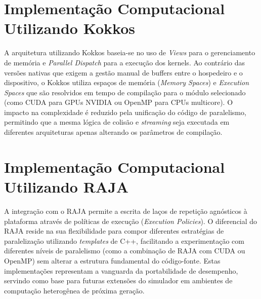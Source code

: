 \section{Implementação Computacional Utilizando Kokkos}\label{sec:implementacao-computacional-utilizando-kokkos}

A arquitetura utilizando Kokkos baseia-se no uso de \textit{Views} para o gerenciamento de memória e \textit{Parallel Dispatch} para a execução dos kernels.
Ao contrário das versões nativas que exigem a gestão manual de buffers entre o hospedeiro e o dispositivo, o Kokkos utiliza espaços de memória (\textit{Memory Spaces}) e \textit{Execution Spaces} que são resolvidos em tempo de compilação para o módulo selecionado (como CUDA para GPUs NVIDIA ou OpenMP para CPUs multicore).
O impacto na complexidade é reduzido pela unificação do código de paralelismo, permitindo que a mesma lógica de colisão e \textit{streaming} seja executada em diferentes arquiteturas apenas alterando os parâmetros de compilação.


\section{Implementação Computacional Utilizando RAJA}\label{sec:implementacao-computacional-utilizando-raja}

A integração com o RAJA permite a escrita de laços de repetição agnósticos à plataforma através de políticas de execução (\textit{Execution Policies}).
O diferencial do RAJA reside na sua flexibilidade para compor diferentes estratégias de paralelização utilizando \textit{templates} de C++, facilitando a experimentação com diferentes níveis de paralelismo (como a combinação de RAJA com CUDA ou OpenMP) sem alterar a estrutura fundamental do código-fonte.
Estas implementações representam a vanguarda da portabilidade de desempenho, servindo como base para futuras extensões do simulador em ambientes de computação heterogênea de próxima geração.




